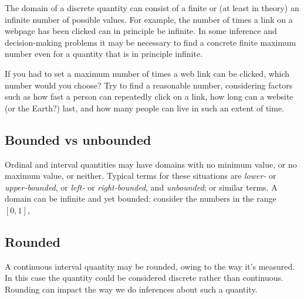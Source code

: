 \documentclass[
  a4paper,
  DIV=11,
  numbers=noendperiod,
  oneside]{scrreprt}
\begin{document}
The domain of a discrete quantity can consist of a finite or (at least
in theory) an infinite number of possible values. For example, the
number of times a link on a webpage has been clicked can in principle be
infinite. In some inference and decision-making problems it may be
necessary to find a concrete finite maximum number even for a quantity
that is in principle infinite.

\begin{tcolorbox}[enhanced jigsaw, leftrule=.75mm, colbacktitle=quarto-callout-caution-color!10!white, arc=.35mm, opacitybacktitle=0.6, bottomtitle=1mm, bottomrule=.15mm, colback=white, toprule=.15mm, opacityback=0, colframe=quarto-callout-caution-color-frame, toptitle=1mm, titlerule=0mm, breakable, title={\faIcon{user-edit} Exercises}, rightrule=.15mm, left=2mm, coltitle=black]

If you had to set a maximum number of times a web link can be clicked,
which number would you choose? Try to find a reasonable number,
considering factors such as how fast a person can repeatedly click on a
link, how long can a website (or the Earth?) last, and how many people
can live in such an extent of time.

\end{tcolorbox}

\hypertarget{bounded-vs-unbounded}{%
\subsection{Bounded vs unbounded}\label{bounded-vs-unbounded}}

Ordinal and interval quantities may have domains with no minimum value,
or no maximum value, or neither. Typical terms for these situations are
\emph{lower-} or \emph{upper-bounded}, or \emph{left-} or
\emph{right-bounded}, and \emph{unbounded}; or similar terms. A domain
can be infinite and yet bounded: consider the numbers in the range
\([0,1]\),

\hypertarget{rounded}{%
\subsection{Rounded}\label{rounded}}

A continuous interval quantity may be rounded, owing to the way it's
measured. In this case the quantity could be considered discrete rather
than continuous. Rounding can impact the way we do inferences about such
a quantity.
\end{document}
